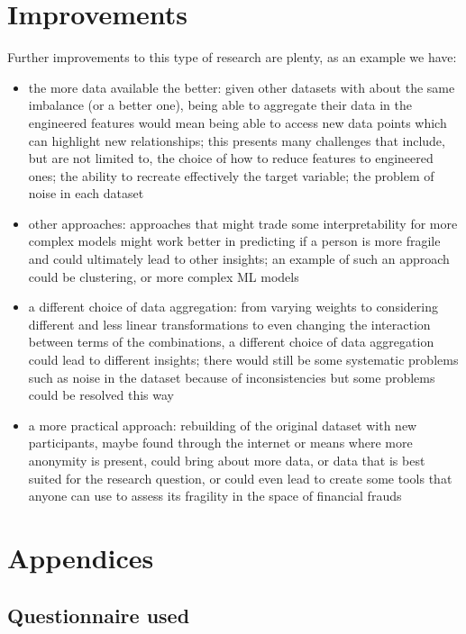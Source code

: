 \documentclass[a4paper,11pt]{article}
\begin{document}
\section{Improvements}
Further improvements to this type of research are plenty, as an example we have:
\begin{itemize}
    \item the more data available the better: given other datasets with about the same imbalance (or a better one), being able to aggregate their data in the engineered features would mean being able to access new data points which can highlight new relationships; this presents many challenges that include, but are not limited to, the choice of how to reduce features to engineered ones; the ability to recreate effectively the target variable; the problem of noise in each dataset
    \item other approaches: approaches that might trade some interpretability for more complex models might work better in predicting if a person is more fragile and could ultimately lead to other insights; an example of such an approach could be clustering, or more complex ML models
    \item a different choice of data aggregation: from varying weights to considering different and less linear transformations to even changing the interaction between terms of the combinations, a different choice of data aggregation could lead to different insights; there would still be some systematic problems such as noise in the dataset because of inconsistencies but some problems could be resolved this way
    \item a more practical approach: rebuilding of the original dataset with new participants, maybe found through the internet or means where more anonymity is present, could bring about more data, or data that is best suited for the research question, or could even lead to create some tools that anyone can use to assess its fragility in the space of financial frauds
\end{itemize}


\newpage
\section{Appendices}

\subsection{Questionnaire used }\label{sec:appendix}
\end{document}
